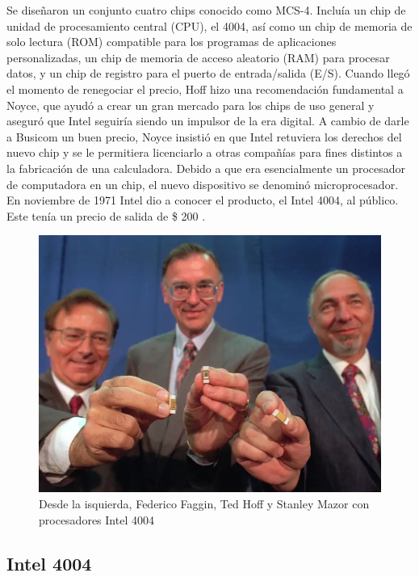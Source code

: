 Se diseñaron un conjunto cuatro chips conocido como MCS-4. Incluía un chip de unidad de procesamiento central (CPU), el 4004, así como un chip de memoria 
de solo lectura (ROM) compatible para los programas de aplicaciones personalizadas, un chip de memoria de acceso aleatorio (RAM) para procesar datos, y un 
chip de registro para el puerto de entrada/salida (E/S). Cuando llegó el momento de renegociar el precio, Hoff hizo una recomendación fundamental a Noyce, 
que ayudó a crear un gran mercado para los chips de uso general y aseguró que Intel seguiría siendo un impulsor de la era digital.
A cambio de darle a Busicom un buen precio, Noyce insistió en que Intel retuviera los derechos del nuevo chip y se le permitiera licenciarlo a otras 
compañías para fines distintos a la fabricación de una calculadora. Debido a que era esencialmente un procesador de computadora en un chip, el nuevo dispositivo 
se denominó microprocesador. En noviembre de 1971 Intel dio a conocer el producto, el Intel 4004, al público. Este tenía un precio de salida de \$ 200
.

\begin{figure}[htb]
	\centering
	\includegraphics[scale = 0.25]{Graphics/faggin_hoff_mazor_-4004.jpg}
	\caption{Desde la isquierda, Federico Faggin, Ted Hoff y Stanley Mazor con procesadores Intel 4004}
	\label{fig:10}
\end{figure}

\subsection{Intel 4004}

